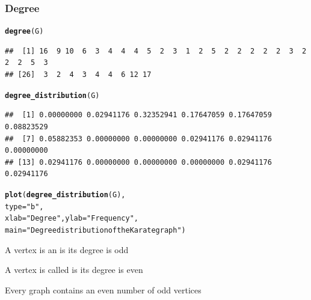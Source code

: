 \documentclass[aspectratio=169]{beamer}\usepackage[]{graphicx}\usepackage[]{xcolor}
\makeatletter
\newcommand{\hlsng}[1]{\textcolor[rgb]{0.192,0.494,0.8}{#1}}%
\newcommand{\hldef}[1]{\textcolor[rgb]{0.345,0.345,0.345}{#1}}%
\newcommand{\hlkwc}[1]{\textcolor[rgb]{0.333,0.667,0.333}{#1}}%
\newcommand{\hlkwd}[1]{\textcolor[rgb]{0.737,0.353,0.396}{\textbf{#1}}}%
\newenvironment{kframe}{%
 \def\at@end@of@kframe{}%
 \ifinner\ifhmode%
  \def\at@end@of@kframe{\end{minipage}}%
  \begin{minipage}{\columnwidth}%
 \fi\fi%
 \def\FrameCommand##1{\hskip\@totalleftmargin \hskip-\fboxsep
 \colorbox{shadecolor}{##1}\hskip-\fboxsep
     \hskip-\linewidth \hskip-\@totalleftmargin \hskip\columnwidth}%
 \MakeFramed {\advance\hsize-\width
   \@totalleftmargin\z@ \linewidth\hsize
   \@setminipage}}%
 {\par\unskip\endMakeFramed%
 \at@end@of@kframe}
\newenvironment{knitrout}{}{} %
\makeatother
\begin{document}
\begin{frame}[fragile]\frametitle{Degree}
\begin{knitrout}
\color{fgcolor}\begin{kframe}
\begin{alltt}
\hlkwd{degree}\hldef{(G)}
\end{alltt}
\begin{verbatim}
##  [1] 16  9 10  6  3  4  4  4  5  2  3  1  2  5  2  2  2  2  2  3  2  2  2  5  3
## [26]  3  2  4  3  4  4  6 12 17
\end{verbatim}
\begin{alltt}
\hlkwd{degree_distribution}\hldef{(G)}
\end{alltt}
\begin{verbatim}
##  [1] 0.00000000 0.02941176 0.32352941 0.17647059 0.17647059 0.08823529
##  [7] 0.05882353 0.00000000 0.00000000 0.02941176 0.02941176 0.00000000
## [13] 0.02941176 0.00000000 0.00000000 0.00000000 0.02941176 0.02941176
\end{verbatim}
\begin{alltt}
\hlkwd{plot}\hldef{(}\hlkwd{degree_distribution}\hldef{(G),}
     \hlkwc{type} \hldef{=} \hlsng{"b"}\hldef{,}
     \hlkwc{xlab} \hldef{=} \hlsng{"Degree"}\hldef{,} \hlkwc{ylab} \hldef{=} \hlsng{"Frequency"}\hldef{,}
     \hlkwc{main} \hldef{=} \hlsng{"Degree distribution of the Karate graph"}\hldef{)}
\end{alltt}
\end{kframe}
\end{knitrout}
\end{frame}




\begin{frame}
\begin{definition}
A vertex is an  is its degree is odd
\end{definition}
\vfill
\begin{definition}
A vertex is called  is its degree is even
\end{definition}
\vfill
\begin{theorem}\label{th:even-nb-odd-vertices}
Every graph contains an even number of odd vertices
\end{theorem}
\end{frame}
\end{document}
